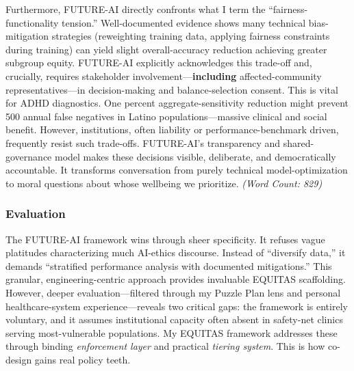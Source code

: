 \documentclass[11pt,twoside]{article}
\begin{document}
Furthermore, FUTURE-AI directly confronts what I term the ``fairness-functionality tension.'' Well-documented evidence shows many technical bias-mitigation strategies (reweighting training data, applying fairness constraints during training) can yield slight overall-accuracy reduction achieving greater subgroup equity. FUTURE-AI explicitly acknowledges this trade-off and, crucially, requires stakeholder involvement---\textbf{including} affected-community representatives---in decision-making and balance-selection consent. This is vital for ADHD diagnostics. One percent aggregate-sensitivity reduction might prevent 500 annual false negatives in Latino populations---massive clinical and social benefit. However, institutions, often liability or performance-benchmark driven, frequently resist such trade-offs. FUTURE-AI's transparency and shared-governance model makes these decisions visible, deliberate, and democratically accountable. It transforms conversation from purely technical model-optimization to moral questions about whose wellbeing we prioritize. \textit{(Word Count: 829)}

\newpage

\subsubsection*{Evaluation}

\vspace{-0.3cm}

The FUTURE-AI framework wins through sheer specificity. It refuses vague platitudes characterizing much AI-ethics discourse. Instead of ``diversify data,'' it demands ``stratified performance analysis with documented mitigations.'' This granular, engineering-centric approach provides invaluable EQUITAS scaffolding. However, deeper evaluation---filtered through my Puzzle Plan lens and personal healthcare-system experience---reveals two critical gaps: the framework is entirely voluntary, and it assumes institutional capacity often absent in safety-net clinics serving most-vulnerable populations. My EQUITAS framework addresses these through binding \textit{enforcement layer} and practical \textit{tiering system}. This is how co-design gains real policy teeth.
\end{document}
